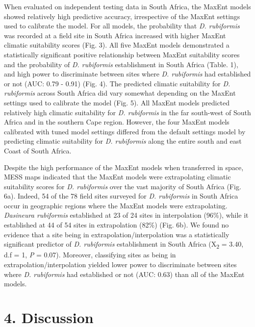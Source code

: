 \documentclass[12pt,]{article}
\begin{document}
When evaluated on independent testing data in South Africa, the MaxEnt
models showed relatively high predictive accuracy, irrespective of the
MaxEnt settings used to calibrate the model. For all models, the
probability that \emph{D. rubiformis} was recorded at a field site in
South Africa increased with higher MaxEnt climatic suitability scores
(Fig. 3). All five MaxEnt models demonstrated a statistically
significant positive relationship between MaxEnt suitability scores and
the probability of \emph{D. rubiformis} establishment in South Africa
(Table. 1), and high power to discriminate between sites where \emph{D.
rubiformis} had established or not (AUC: 0.79 - 0.91) (Fig. 4). The
predicted climatic suitability for \emph{D. rubiformis} across South
Africa did vary somewhat depending on the MaxEnt settings used to
calibrate the model (Fig. 5). All MaxEnt models predicted relatively
high climatic suitability for \emph{D. rubiformis} in the far south-west
of South Africa and in the southern Cape region. However, the four
MaxEnt models calibrated with tuned model settings differed from the
default settings model by predicting climatic suitability for \emph{D.
rubiformis} along the entire south and east Coast of South Africa.

Despite the high performance of the MaxEnt models when transferred in
space, MESS maps indicated that the MaxEnt models were extrapolating
climatic suitability scores for \emph{D. rubiformis} over the vast
majority of South Africa (Fig. 6a). Indeed, 54 of the 78 field sites
surveyed for \emph{D. rubiformis} in South Africa occur in geographic
regions where the MaxEnt models were extrapolating. \emph{Dasineura
rubiformis} established at 23 of 24 sites in interpolation (96\%), while
it established at 44 of 54 sites in extrapolation (82\%) (Fig. 6b). We
found no evidence that a site being in extrapolation/interpolation was a
statistically significant predictor of \emph{D. rubiformis}
establishment in South Africa (X\textsubscript{2} = 3.40, d.f = 1,
\emph{P} = 0.07). Moreover, classifying sites as being in
extrapolation/interpolation yielded lower power to discriminate between
sites where \emph{D. rubiformis} had established or not (AUC: 0.63) than
all of the MaxEnt models.

\hypertarget{discussion}{%
\section{4. Discussion}\label{discussion}}
\end{document}
